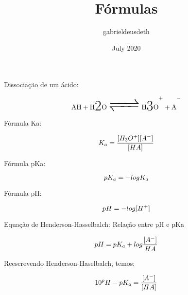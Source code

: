 \documentclass{article}
\title{Fórmulas}
\author{gabrieldeusdeth}
\date{July 2020}
\begin{document}
\maketitle

Dissociação de um ácido:

\begin{equation}
    \Huge\ce{ AH + H2O <=> H3O^+ + A^- }    
\end{equation}

Fórmula Ka:

\begin{equation}
    \Huge K_a = \frac{[H_3O^+] [A^-]}{[HA]}
\end{equation}

Fórmula pKa:

\begin{equation}
    \Huge pK_a = -logK_a
\end{equation}

Fórmula pH:

\begin{equation}
    \Huge pH = -log[H^+]
\end{equation}

Equação de Henderson-Hasselbalch: Relação entre pH e pKa 

\begin{equation}
    \Huge pH = pK_a + log\frac{[A^-]}{HA}
\end{equation}

Reescrevendo Henderson-Haselbalch, temos:

\begin{equation}
    \Huge 10^pH-pK_a = \frac{[A^-]}{[HA]}
\end{equation}
\end{document}
